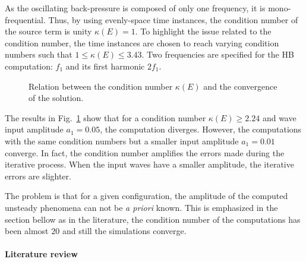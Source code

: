 As the oscillating back-pressure is composed of only one frequency,
it is mono-frequential.
Thus, by using evenly-space time instances, the condition
number of the source term is unity $\kappa (E) = 1$. 
To highlight the issue related to the condition number,
the time instances are chosen to reach varying condition numbers
such that $1 \leq \kappa (E) \leq 3.43$.  
Two frequencies are
specified for the HB computation: $f_1$ and its first harmonic
$2f_1$. 


\begin{figure}[htp]
  \centering
  \caption{Relation between the condition number $\kappa (E)$ and the convergence of the solution.}
  \label{fig:canal_residual_vs_conditionning}
\end{figure}
The results in Fig.~\ref{fig:canal_residual_vs_conditionning} show that
for a condition number $\kappa (E) \geq 2.24$ and wave input amplitude
$a_1 = 0.05$, the computation diverges. However, the computations with
the same condition numbers but a smaller input amplitude $a_1 = 0.01$
converge. In fact, the condition number amplifies the errors made
during the iterative process. When the input waves have a smaller
amplitude, the iterative errors are slighter.

The problem is that for a given configuration, the amplitude of the computed unsteady phenomena can not
be \emph{a priori} known. This is emphasized in the section bellow
as in the literature, the condition number of the computations
has been almost $20$ and still the simulations converge.

\paragraph{Literature review}
\label{sec:condition_literature}

